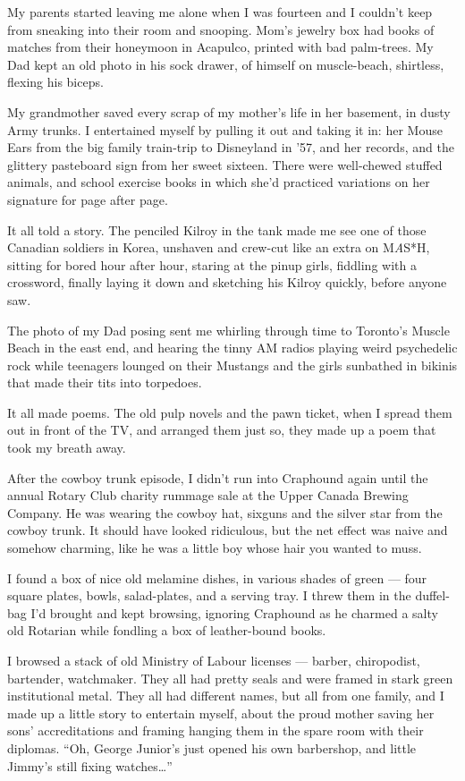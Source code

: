 My parents started leaving me alone when I was fourteen and I
couldn't keep from sneaking into their room and snooping. Mom's
jewelry box had books of matches from their honeymoon in Acapulco,
printed with bad palm-trees. My Dad kept an old photo in his sock
drawer, of himself on muscle-beach, shirtless, flexing his biceps.

My grandmother saved every scrap of my mother's life in her
basement, in dusty Army trunks. I entertained myself by pulling it
out and taking it in: her Mouse Ears from the big family train-trip
to Disneyland in '57, and her records, and the glittery pasteboard
sign from her sweet sixteen. There were well-chewed stuffed
animals, and school exercise books in which she'd practiced
variations on her signature for page after page.

It all told a story. The penciled Kilroy in the tank made me see
one of those Canadian soldiers in Korea, unshaven and crew-cut like
an extra on M\emph{A}S*H, sitting for bored hour after hour,
staring at the pinup girls, fiddling with a crossword, finally
laying it down and sketching his Kilroy quickly, before anyone
saw.

The photo of my Dad posing sent me whirling through time to
Toronto's Muscle Beach in the east end, and hearing the tinny AM
radios playing weird psychedelic rock while teenagers lounged on
their Mustangs and the girls sunbathed in bikinis that made their
tits into torpedoes.

It all made poems. The old pulp novels and the pawn ticket, when I
spread them out in front of the TV, and arranged them just so, they
made up a poem that took my breath away.

\tb

After the cowboy trunk episode, I didn't run into Craphound again
until the annual Rotary Club charity rummage sale at the Upper
Canada Brewing Company. He was wearing the cowboy hat, sixguns and
the silver star from the cowboy trunk. It should have looked
ridiculous, but the net effect was naive and somehow charming, like
he was a little boy whose hair you wanted to muss.

I found a box of nice old melamine dishes, in various shades of
green --- four square plates, bowls, salad-plates, and a serving
tray. I threw them in the duffel-bag I'd brought and kept browsing,
ignoring Craphound as he charmed a salty old Rotarian while
fondling a box of leather-bound books.

I browsed a stack of old Ministry of Labour licenses --- barber,
chiropodist, bartender, watchmaker. They all had pretty seals and
were framed in stark green institutional metal. They all had
different names, but all from one family, and I made up a little
story to entertain myself, about the proud mother saving her sons'
accreditations and framing hanging them in the spare room with
their diplomas.
``Oh, George Junior's just opened his own barbershop, and little 
Jimmy's still fixing watches\ldots{}''

